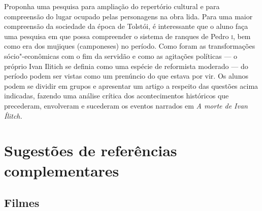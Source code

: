 \documentclass[12pt]{extarticle}
\begin{document}
Proponha uma pesquisa para ampliação do repertório cultural e para
compreensão do lugar ocupado pelas personagens na obra lida. Para uma
maior compreensão da sociedade da época de Tolstói, é interessante que
o aluno faça uma pesquisa em que possa compreender o sistema de
ranques de Pedro \textsc{i}, bem como era dos mujiques (camponeses) no período.
Como foram as transformações sócio"-econômicas com o fim da servidão e
como as agitações políticas --- o próprio Ivan Ilitich se definia como
uma espécie de reformista moderado --- do período podem ser vistas como
um prenúncio do que estava por vir. Os alunos podem se dividir em
grupos e apresentar um artigo a respeito das questões acima indicadas,
fazendo uma análise crítica dos acontecimentos históricos que
precederam, envolveram e sucederam os eventos narrados em \emph{A
morte de Ivan Ílitch.}



\section{Sugestões de referências complementares}


\subsection{Filmes}
\end{document}
